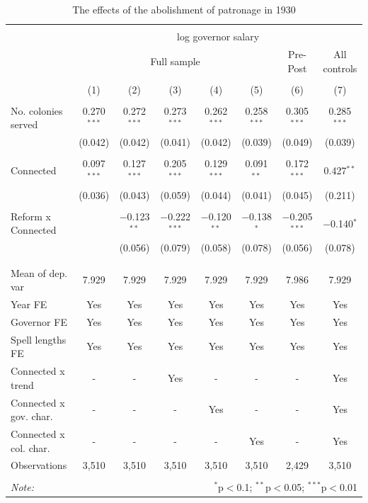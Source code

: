 \documentclass[a4paper]{article}\usepackage[]{graphicx}\usepackage[]{color}
\begin{document}
\begin{table}[!htbp] \centering 
  \caption{The effects of the abolishment of patronage in 1930} 
  \label{tab:abol} 
\scriptsize 
\begin{tabular}{@{\extracolsep{5pt}}lccccccc} 
\\[-1.8ex]\hline 
\hline \\[-1.8ex] 
 & \multicolumn{7}{c}{log governor salary} \\ 
\cline{2-8} 
 & \multicolumn{5}{c}{Full sample} & Pre-Post & All controls \\ 
\\[-1.8ex] & (1) & (2) & (3) & (4) & (5) & (6) & (7)\\ 
\hline \\[-1.8ex] 
 No. colonies served & 0.270$^{***}$ & 0.272$^{***}$ & 0.273$^{***}$ & 0.262$^{***}$ & 0.258$^{***}$ & 0.305$^{***}$ & 0.285$^{***}$ \\ 
  & (0.042) & (0.042) & (0.041) & (0.042) & (0.039) & (0.049) & (0.039) \\ 
  & & & & & & & \\ 
 Connected & 0.097$^{***}$ & 0.127$^{***}$ & 0.205$^{***}$ & 0.129$^{***}$ & 0.091$^{**}$ & 0.172$^{***}$ & 0.427$^{**}$ \\ 
  & (0.036) & (0.043) & (0.059) & (0.044) & (0.041) & (0.045) & (0.211) \\ 
  & & & & & & & \\ 
 Reform x Connected &  & $-$0.123$^{**}$ & $-$0.222$^{***}$ & $-$0.120$^{**}$ & $-$0.138$^{*}$ & $-$0.205$^{***}$ & $-$0.140$^{*}$ \\ 
  &  & (0.056) & (0.079) & (0.058) & (0.078) & (0.056) & (0.078) \\ 
  & & & & & & & \\ 
\hline \\[-1.8ex] 
Mean of dep. var & 7.929 & 7.929 & 7.929 & 7.929 & 7.929 & 7.986 & 7.929 \\ 
Year FE & Yes & Yes & Yes & Yes & Yes & Yes & Yes \\ 
Governor FE & Yes & Yes & Yes & Yes & Yes & Yes & Yes \\ 
Spell lengths FE & Yes & Yes & Yes & Yes & Yes & Yes & Yes \\ 
Connected x trend & - & - & Yes & - & - & - & Yes \\ 
Connected x gov. char. & - & - & - & Yes & - & - & Yes \\ 
Connected x col. char. & - & - & - & - & Yes & - & Yes \\ 
Observations & 3,510 & 3,510 & 3,510 & 3,510 & 3,510 & 2,429 & 3,510 \\ 
\hline 
\hline \\[-1.8ex] 
\textit{Note:}  & \multicolumn{7}{r}{$^{*}$p$<$0.1; $^{**}$p$<$0.05; $^{***}$p$<$0.01} \\ 
\end{tabular} 
\end{table} 
\end{document}
